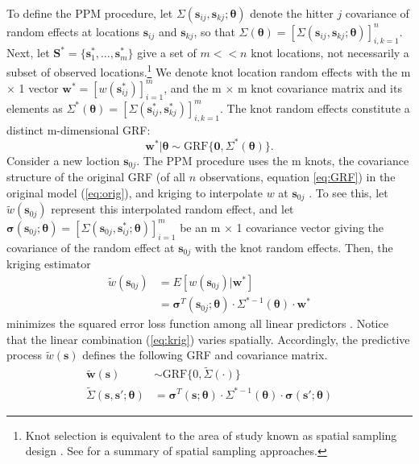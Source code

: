 To define the PPM procedure, let $\Sigma(\pmb{s}_{ij}, \pmb{s}_{kj}; \pmb{\theta})$ denote the hitter $j$ covariance of random effects at locations $\pmb{s}_{ij}$ and $\pmb{s}_{kj}$, so that $\Sigma(\pmb{\theta}) = [\Sigma(\pmb{s}_{ij}, \pmb{s}_{kj}; \pmb{\theta})]_{i,k=1}^{n}$. Next, let $\pmb{S}^{*} = \{\pmb{s}_{1}^{*}, \dots, \pmb{s}_{m}^{*}\}$ give a set of $m << n$ knot locations, not necessarily a subset of observed locations.\footnote{Knot selection is equivalent to the area of study known as spatial sampling design \citep{Finley2009}. See \citep{Xia2006} for a summary of spatial sampling approaches.} We denote knot location random effects with the m $\times$ 1 vector $\pmb{w}^{*} = \left[w(\pmb{s}_{ij}^{*})\right]_{i=1}^{m}$, and the m $\times$ m knot covariance matrix and its elements as $\Sigma^{*}(\pmb{\theta}) = \left[\Sigma(\pmb{s}_{ij}^{*}, \pmb{s}_{kj}^{*})\right]_{i,k = 1}^{m}$. The knot random effects constitute a distinct m-dimensional GRF:
\begin{equation}
\pmb{w}^{*}|\pmb{\theta} \sim \text{GRF}\{\pmb{0}, \Sigma^{*}(\pmb{\theta})\}.
\end{equation}
Consider a new loction $\pmb{s}_{0j}$. The PPM procedure uses the m knots, the covariance structure of the original GRF (of all $n$ observations, equation \ref{eq:GRF}) in the original model (\ref{eq:orig}), and kriging to interpolate $w$ at $\pmb{s}_{0j}$ \citep{Schabenberger2004}. To see this, let $\tilde{w}(\pmb{s}_{0j})$ represent this interpolated random effect, and let $\pmb{\sigma}(\pmb{s}_{0j};\pmb{\theta}) = \left[\Sigma(\pmb{s}_{0j}, \pmb{s}_{ij}^{*}; \pmb{\theta})\right]_{i = 1}^{m}$ be an m $\times$ 1 covariance vector giving the covariance of the random effect at $\pmb{s}_{0j}$ with the knot random effects. Then, the kriging estimator
\begin{align}
\tilde{w}(\pmb{s}_{0j}) &= E[w(\pmb{s}_{0j})|\pmb{w}^{*}] \\ 
&= \pmb{\sigma}^{T}(\pmb{s}_{0j};\pmb{\theta}) \cdot \Sigma^{*-1}(\pmb{\theta}) \cdot \pmb{w}^{*} \label{eq:krig}
\end{align}
minimizes the squared error loss function among all linear predictors \citep{Schabenberger2004}. Notice that the linear combination (\ref{eq:krig}) varies spatially. Accordingly, the predictive process $\tilde{w}(\pmb{s})$ defines the following GRF and covariance matrix.
\begin{align}
\tilde{\pmb{w}}(\pmb{s}) &\sim \text{GRF}\{0, \widetilde{\Sigma}(\cdot)\} \\
\widetilde{\Sigma}(\pmb{s}, \pmb{s}'; \pmb{\theta}) &= \pmb{\sigma}^{T}(\pmb{s};\pmb{\theta}) \cdot \Sigma^{*-1}(\pmb{\theta}) \cdot \pmb{\sigma}(\pmb{s}';\pmb{\theta})
\end{align}

